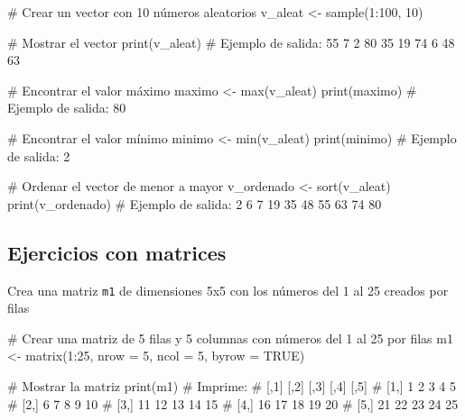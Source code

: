 \documentclass[
  letterpaper,
]{scrbook}
\newenvironment{Shaded}{\begin{snugshade}}{\end{snugshade}}
\newcommand{\AttributeTok}[1]{\textcolor[rgb]{0.40,0.45,0.13}{#1}}
\newcommand{\CommentTok}[1]{\textcolor[rgb]{0.37,0.37,0.37}{#1}}
\newcommand{\ConstantTok}[1]{\textcolor[rgb]{0.56,0.35,0.01}{#1}}
\newcommand{\DecValTok}[1]{\textcolor[rgb]{0.68,0.00,0.00}{#1}}
\newcommand{\FunctionTok}[1]{\textcolor[rgb]{0.28,0.35,0.67}{#1}}
\newcommand{\NormalTok}[1]{\textcolor[rgb]{0.00,0.23,0.31}{#1}}
\newcommand{\OtherTok}[1]{\textcolor[rgb]{0.00,0.23,0.31}{#1}}
\newcommand{\SpecialCharTok}[1]{\textcolor[rgb]{0.37,0.37,0.37}{#1}}
\begin{document}
\begin{Shaded}
\begin{Highlighting}[]
\CommentTok{\# Crear un vector con 10 números aleatorios}
\NormalTok{v\_aleat }\OtherTok{\textless{}{-}} \FunctionTok{sample}\NormalTok{(}\DecValTok{1}\SpecialCharTok{:}\DecValTok{100}\NormalTok{, }\DecValTok{10}\NormalTok{)}

\CommentTok{\# Mostrar el vector}
\FunctionTok{print}\NormalTok{(v\_aleat)}
\CommentTok{\# Ejemplo de salida: 55  7  2  80 35 19 74  6 48 63}

\CommentTok{\# Encontrar el valor máximo}
\NormalTok{maximo }\OtherTok{\textless{}{-}} \FunctionTok{max}\NormalTok{(v\_aleat)}
\FunctionTok{print}\NormalTok{(maximo)}
\CommentTok{\# Ejemplo de salida: 80}

\CommentTok{\# Encontrar el valor mínimo}
\NormalTok{minimo }\OtherTok{\textless{}{-}} \FunctionTok{min}\NormalTok{(v\_aleat)}
\FunctionTok{print}\NormalTok{(minimo)}
\CommentTok{\# Ejemplo de salida: 2}

\CommentTok{\# Ordenar el vector de menor a mayor}
\NormalTok{v\_ordenado }\OtherTok{\textless{}{-}} \FunctionTok{sort}\NormalTok{(v\_aleat)}
\FunctionTok{print}\NormalTok{(v\_ordenado)}
\CommentTok{\# Ejemplo de salida: 2  6  7 19 35 48 55 63 74 80}
\end{Highlighting}
\end{Shaded}

\hypertarget{ejercicios-con-matrices}{%
\subsection{Ejercicios con matrices}\label{ejercicios-con-matrices}}

Crea una matriz \texttt{m1} de dimensiones 5x5 con los números del 1 al
25 creados por filas

\begin{Shaded}
\begin{Highlighting}[]
\CommentTok{\# Crear una matriz de 5 filas y 5 columnas con números del 1 al 25 por filas}
\NormalTok{m1 }\OtherTok{\textless{}{-}} \FunctionTok{matrix}\NormalTok{(}\DecValTok{1}\SpecialCharTok{:}\DecValTok{25}\NormalTok{, }\AttributeTok{nrow =} \DecValTok{5}\NormalTok{, }\AttributeTok{ncol =} \DecValTok{5}\NormalTok{, }\AttributeTok{byrow =} \ConstantTok{TRUE}\NormalTok{)}

\CommentTok{\# Mostrar la matriz}
\FunctionTok{print}\NormalTok{(m1)}
\CommentTok{\# Imprime:}
\CommentTok{\#      [,1] [,2] [,3] [,4] [,5]}
\CommentTok{\# [1,]    1    2    3    4    5}
\CommentTok{\# [2,]    6    7    8    9   10}
\CommentTok{\# [3,]   11   12   13   14   15}
\CommentTok{\# [4,]   16   17   18   19   20}
\CommentTok{\# [5,]   21   22   23   24   25}
\end{Highlighting}
\end{Shaded}
\end{document}
